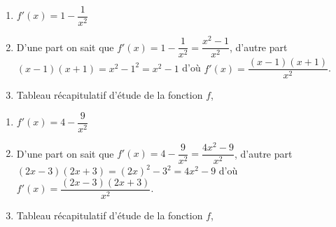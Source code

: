 \documentclass[french]{book}
\begin{document}
\begin{corrige}
\begin{enumerate}

\item $f'(x)=1-\dfrac{1}{x^2}$
\item D'une part on sait que $f'(x)=1-\dfrac{1}{x^2}=\dfrac{x^2-1}{x^2}$, d'autre part $(x-1)(x+1)=x^2-1^2= x^2-1$ d'où $f'(x)=\dfrac{(x-1)(x+1)}{x^2}$.
\item Tableau récapitulatif d'étude de la fonction $f$,
\begin{center}
\end{center}
\end{enumerate}
\end{corrige}

\begin{corrige}
\begin{enumerate}

\item $f'(x)=4-\dfrac{9}{x^2}$
\item D'une part on sait que $f'(x)=4-\dfrac{9}{x^2}=\dfrac{4x^2-9}{x^2}$, d'autre part $(2x-3)(2x+3)=(2x)^2-3^2= 4x^2-9$ d'où $f'(x)=\dfrac{(2x-3)(2x+3)}{x^2}$.
\item Tableau récapitulatif d'étude de la fonction $f$,
\begin{center}
\end{center}
\end{enumerate}
\end{corrige}
\end{document}
